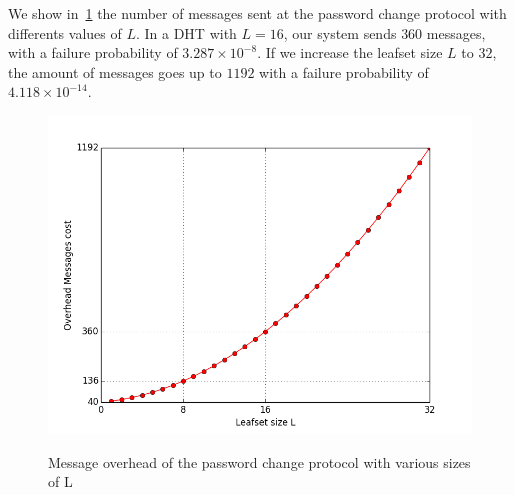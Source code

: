    We show in~\ref{fig:password_change_messages} the number of messages sent at
the password change protocol with differents values of $L$. In a DHT with
$L = 16$, our system sends $360$ messages, with a failure probability of
 $3.287 \times 10^{-8}$. If we increase the leafset size $L$ to $32$, the amount of
messages goes up to $1192$ with a failure probability of $4.118 \times 10^{-14}$.

\begin{figure}[!htb]
\centering
\includegraphics[width=14cm]{../plots/password_change_messages}\\
\caption{Message overhead of the password change protocol with various sizes of L}
\label{fig:password_change_messages}
\end{figure}

